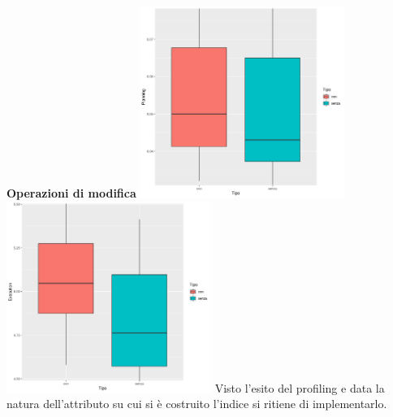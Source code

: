\documentclass{article}
\begin{document}
\textbf{Operazioni di modifica}
\newline
\newline
\includegraphics[width=0.5\textwidth]{planning_impiegato_qualifica_modifica.png}
\includegraphics[width=0.5\textwidth]{execution_impiegato_qualifica_modifica.png}
\newline
\newline
Visto l'esito del profiling e data la natura dell'attributo su cui si è costruito l'indice si ritiene di implementarlo.

\newpage
\end{document}
